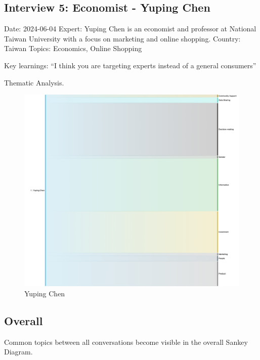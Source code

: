 \documentclass[
  letterpaper,
  DIV=11,
  numbers=noendperiod]{scrartcl}
\begin{document}
\subsection{Interview 5: Economist - Yuping
Chen}\label{interview-5-economist---yuping-chen}

Date: 2024-06-04 Expert: Yuping Chen is an economist and professor at
National Taiwan University with a focus on marketing and online
shopping. Country: Taiwan Topics: Economics, Online Shopping

Key learnings: ``I think you are targeting experts instead of a general
consumers''

Thematic Analysis.

\begin{figure}[H]

{\centering \includegraphics[width=1\textwidth,height=\textheight]{./images/experts/sankey-yuping.png}

}

\caption{Yuping Chen}

\end{figure}%

\subsection{Overall}\label{overall}

Common topics between all conversations become visible in the overall
Sankey Diagram.
\end{document}
